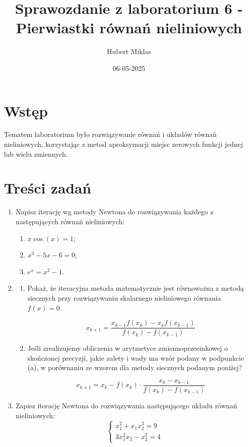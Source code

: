 \documentclass[a4paper,12pt]{article}
\title{Sprawozdanie z laboratorium 6 - Pierwiastki równań nieliniowych}
\author{Hubert Miklas}
\date{06-05-2025}
\begin{document}
\maketitle

\section{Wstęp}

Tematem laboratorium było rozwiązywanie równań i układów równań nieliniowych, korzystając z metod aproksymacji miejsc zerowych funkcji jednej lub wielu zmiennych.

\section{Treści zadań}

\begin{enumerate}
  \item Napisz iterację wg metody Newtona do rozwiązywania każdego z następujących równań nieliniowych:
  \begin{enumerate}
    \item $x \cos(x) = 1$;
    \item $x^3 - 5x - 6 = 0$;
    \item $e^x = x^2 - 1$.
  \end{enumerate}

  \item 
  \begin{enumerate}
    \item Pokaż, że iteracyjna metoda matematycznie jest równoważna z metodą siecznych przy rozwiązywaniu skalarnego nieliniowego równania $f(x) = 0$.
    
    \[
    x_{k+1} = \frac{x_{k-1} f(x_k) - x_k f(x_{k-1})}{f(x_k) - f(x_{k-1})}
    \]

    \item Jeśli zrealizujemy obliczenia w arytmetyce zmiennoprzecinkowej o skończonej precyzji, jakie zalety i wady ma wzór podany w podpunkcie (a), w porównaniu ze wzorem dla metody siecznych podanym poniżej?

    \[
    x_{k+1} = x_k - f(x_k) \cdot \frac{x_k - x_{k-1}}{f(x_k) - f(x_{k-1})}
    \]
  \end{enumerate}

  \item Zapisz iterację Newtona do rozwiązywania następującego układu równań nieliniowych:
  \[
  \begin{cases}
  x_1^2 + x_1 x_2^3 = 9 \\
  3 x_1^2 x_2 - x_2^2 = 4
  \end{cases}
  \]
\end{enumerate}
\end{document}
